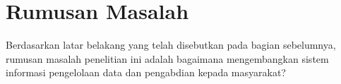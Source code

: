 
		
		


\section{Rumusan Masalah}

Berdasarkan latar belakang yang telah disebutkan pada bagian sebelumnya, 
rumusan masalah penelitian ini adalah bagaimana mengembangkan sistem informasi
pengelolaan data dan pengabdian kepada masyarakat?


